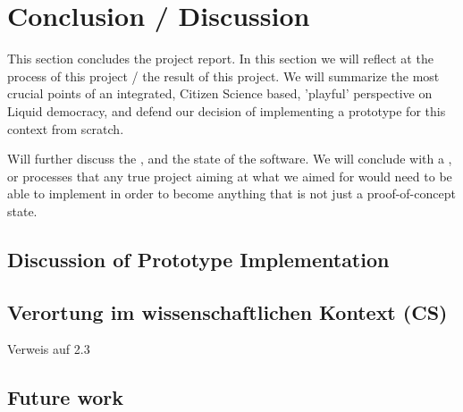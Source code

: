 \chapter{Conclusion / Discussion}
\label{ch:Conclusion}


This section concludes the project report. In this section we will reflect at the process of this project / the result of this project. We will summarize the most crucial points of an integrated, Citizen Science based, 'playful' perspective on Liquid democracy, and defend our decision of implementing a prototype for this context from scratch.

Will further discuss the , and the state of the software. We will conclude with a , or processes that any true project aiming at what we aimed for would need to be able to implement in order to become anything that is not just a proof-of-concept state.

\section{Discussion of Prototype Implementation}
\label{sec:DiscussionImplementation}

\section{Verortung im wissenschaftlichen Kontext (CS)}
\label{sec:DiscussionScientificContext}

Verweis auf 2.3

\section{Future work}
\label{sec:FutureWork}
